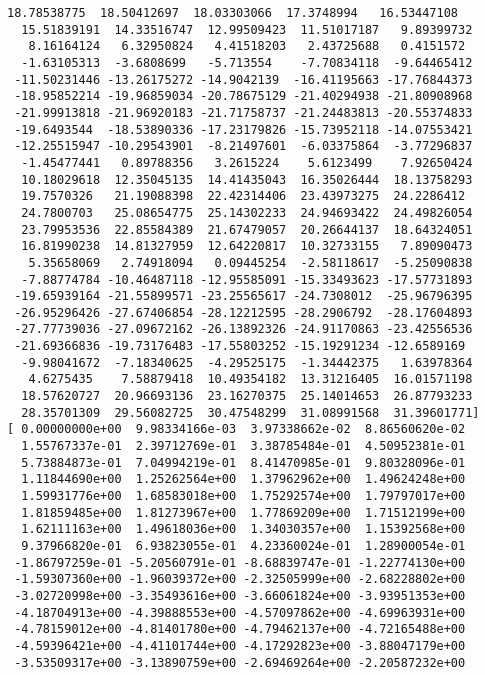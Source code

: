 \documentclass[11pt]{article}
\begin{document}
\begin{Verbatim}[commandchars=\\\{\}]
  18.78538775  18.50412697  18.03303066  17.3748994   16.53447108
  15.51839191  14.33516747  12.99509423  11.51017187   9.89399732
   8.16164124   6.32950824   4.41518203   2.43725688   0.4151572
  -1.63105313  -3.6808699   -5.713554    -7.70834118  -9.64465412
 -11.50231446 -13.26175272 -14.9042139  -16.41195663 -17.76844373
 -18.95852214 -19.96859034 -20.78675129 -21.40294938 -21.80908968
 -21.99913818 -21.96920183 -21.71758737 -21.24483813 -20.55374833
 -19.6493544  -18.53890336 -17.23179826 -15.73952118 -14.07553421
 -12.25515947 -10.29543901  -8.21497601  -6.03375864  -3.77296837
  -1.45477441   0.89788356   3.2615224    5.6123499    7.92650424
  10.18029618  12.35045135  14.41435043  16.35026444  18.13758293
  19.7570326   21.19088398  22.42314406  23.43973275  24.2286412
  24.7800703   25.08654775  25.14302233  24.94693422  24.49826054
  23.79953536  22.85584389  21.67479057  20.26644137  18.64324051
  16.81990238  14.81327959  12.64220817  10.32733155   7.89090473
   5.35658069   2.74918094   0.09445254  -2.58118617  -5.25090838
  -7.88774784 -10.46487118 -12.95585091 -15.33493623 -17.57731893
 -19.65939164 -21.55899571 -23.25565617 -24.7308012  -25.96796395
 -26.95296426 -27.67406854 -28.12212595 -28.2906792  -28.17604893
 -27.77739036 -27.09672162 -26.13892326 -24.91170863 -23.42556536
 -21.69366836 -19.73176483 -17.55803252 -15.19291234 -12.6589169
  -9.98041672  -7.18340625  -4.29525175  -1.34442375   1.63978364
   4.6275435    7.58879418  10.49354182  13.31216405  16.01571198
  18.57620727  20.96693136  23.16270375  25.14014653  26.87793233
  28.35701309  29.56082725  30.47548299  31.08991568  31.39601771]
[ 0.00000000e+00  9.98334166e-03  3.97338662e-02  8.86560620e-02
  1.55767337e-01  2.39712769e-01  3.38785484e-01  4.50952381e-01
  5.73884873e-01  7.04994219e-01  8.41470985e-01  9.80328096e-01
  1.11844690e+00  1.25262564e+00  1.37962962e+00  1.49624248e+00
  1.59931776e+00  1.68583018e+00  1.75292574e+00  1.79797017e+00
  1.81859485e+00  1.81273967e+00  1.77869209e+00  1.71512199e+00
  1.62111163e+00  1.49618036e+00  1.34030357e+00  1.15392568e+00
  9.37966820e-01  6.93823055e-01  4.23360024e-01  1.28900054e-01
 -1.86797259e-01 -5.20560791e-01 -8.68839747e-01 -1.22774130e+00
 -1.59307360e+00 -1.96039372e+00 -2.32505999e+00 -2.68228802e+00
 -3.02720998e+00 -3.35493616e+00 -3.66061824e+00 -3.93951353e+00
 -4.18704913e+00 -4.39888553e+00 -4.57097862e+00 -4.69963931e+00
 -4.78159012e+00 -4.81401780e+00 -4.79462137e+00 -4.72165488e+00
 -4.59396421e+00 -4.41101744e+00 -4.17292823e+00 -3.88047179e+00
 -3.53509317e+00 -3.13890759e+00 -2.69469264e+00 -2.20587232e+00

\end{Verbatim}
\end{document}
